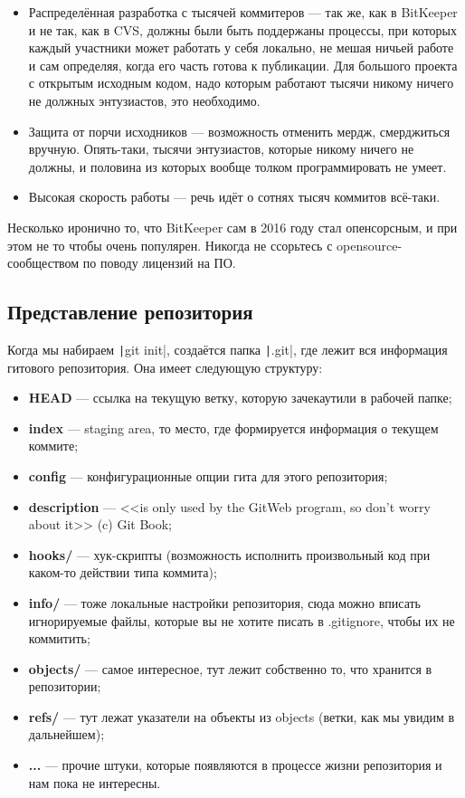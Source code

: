 \documentclass{../text-style}
\begin{document}
\begin{itemize}
    \item Распределённая разработка с тысячей коммитеров --- так же, как в BitKeeper и не так, как в CVS, должны были быть поддержаны процессы, при которых каждый участники может работать у себя локально, не мешая ничьей работе и сам определяя, когда его часть готова к публикации. Для большого проекта с открытым исходным кодом, надо которым работают тысячи никому ничего не должных энтузиастов, это необходимо.
    \item Защита от порчи исходников --- возможность отменить мердж, смерджиться вручную. Опять-таки, тысячи энтузиастов, которые никому ничего не должны, и половина из которых вообще толком программировать не умеет.
    \item Высокая скорость работы --- речь идёт о сотнях тысяч коммитов всё-таки.
\end{itemize}

Несколько иронично то, что BitKeeper сам в 2016 году стал опенсорсным, и при этом не то чтобы очень популярен. Никогда не ссорьтесь с opensource-сообществом по поводу лицензий на ПО.

\subsection{Представление репозитория}

Когда мы набираем \texttt|git init|, создаётся папка \texttt|.git|, где лежит вся информация гитового репозитория. Она имеет следующую структуру:

\begin{itemize}
    \item \textbf{HEAD} --- ссылка на текущую ветку, которую зачекаутили в рабочей папке;
    \item \textbf{index} --- staging area, то место, где формируется информация о текущем коммите;
    \item \textbf{config} --- конфигурационные опции гита для этого репозитория;
    \item \textbf{description} --- <<is only used by the GitWeb program, so don’t worry about it>> (c) Git Book;
    \item \textbf{hooks/} --- хук-скрипты (возможность исполнить произвольный код при каком-то действии типа коммита);
    \item \textbf{info/} --- тоже локальные настройки репозитория, сюда можно вписать игнорируемые файлы, которые вы не хотите писать в .gitignore, чтобы их не коммитить;
    \item \textbf{objects/} --- самое интересное, тут лежит собственно то, что хранится в репозитории;
    \item \textbf{refs/} --- тут лежат указатели на объекты из objects (ветки, как мы увидим в дальнейшем);
    \item \textbf{...} --- прочие штуки, которые появляются в процессе жизни репозитория и нам пока не интересны.
\end{itemize}
\end{document}
